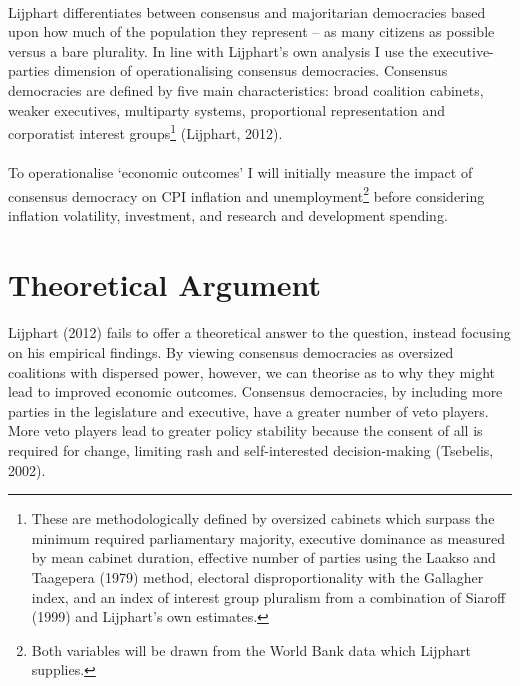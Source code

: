 \documentclass[11pt, oneside]{article}   	%
\let\oldparagraph\paragraph
\renewcommand{\paragraph}[1]{\oldparagraph{#1}\mbox{}}
\begin{document}
\paragraph{}
Lijphart differentiates between consensus and majoritarian democracies based upon how much of the population they represent – as many citizens as possible versus a bare plurality. In line with Lijphart’s own analysis I use the executive-parties dimension of operationalising consensus democracies. Consensus democracies are defined by five main characteristics: broad coalition cabinets, weaker executives, multiparty systems, proportional representation and corporatist interest groups\footnote{These are methodologically defined by oversized cabinets which surpass the minimum required parliamentary majority, executive dominance as measured by mean cabinet duration, effective number of parties using the Laakso and Taagepera (1979) method, electoral disproportionality with the Gallagher index, and an index of interest group pluralism from a combination of Siaroff (1999) and Lijphart’s own estimates.}  (Lijphart, 2012).

\paragraph{}
To operationalise ‘economic outcomes’ I will initially measure the impact of consensus democracy on CPI inflation and unemployment\footnote{Both variables will be drawn from the World Bank data which Lijphart supplies.}  before considering inflation volatility, investment, and research and development spending.

\section{Theoretical Argument}

\paragraph{}
Lijphart (2012) fails to offer a theoretical answer to the question, instead focusing on his empirical findings. By viewing consensus democracies as oversized coalitions with dispersed power, however, we can theorise as to why they might lead to improved economic outcomes. Consensus democracies, by including more parties in the legislature and executive, have a greater number of veto players. More veto players lead to greater policy stability because the consent of all is required for change, limiting rash and self-interested decision-making (Tsebelis, 2002). 
\end{document}
